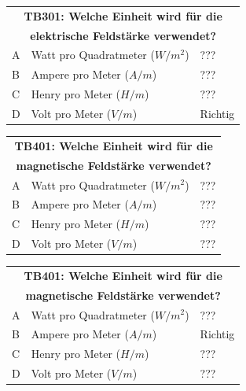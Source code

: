 \begin{frame}
	\begin{center}
	\begin{tabular}{|l|l|l|}
		\hline
		\multicolumn{3}{|c|}{\textbf{TB301: Welche Einheit wird für die}}\\
		\multicolumn{3}{|c|}{\textbf{elektrische Feldstärke verwendet?}}\\
		\hline
		A & Watt pro Quadratmeter ($W/m^2$) & ???     \\ \hline
		B & Ampere pro Meter ($A/m$)        & ???     \\ \hline
		C & Henry pro Meter ($H/m$)         & ???     \\ \hline
		D & Volt pro Meter ($V/m$)          & Richtig \\ \hline
	\end{tabular}
	\end{center}
\end{frame}

\begin{frame}
	\begin{center}
	\begin{tabular}{|l|l|l|}
		\hline
		\multicolumn{3}{|c|}{\textbf{TB401:  Welche Einheit wird für die}}\\
		\multicolumn{3}{|c|}{\textbf{magnetische Feldstärke verwendet?}}\\
		\hline
		A & Watt pro Quadratmeter ($W/m^2$) & ???     \\ \hline
		B & Ampere pro Meter ($A/m$)        & ???     \\ \hline
		C & Henry pro Meter ($H/m$)         & ???     \\ \hline
		D & Volt pro Meter ($V/m$)          & ???     \\ \hline
	\end{tabular}
	\end{center}
\end{frame}

\begin{frame}
	\begin{center}
	\begin{tabular}{|l|l|l|}
		\hline
		\multicolumn{3}{|c|}{\textbf{TB401:  Welche Einheit wird für die}}\\
		\multicolumn{3}{|c|}{\textbf{magnetische Feldstärke verwendet?}}\\
		\hline
		A & Watt pro Quadratmeter ($W/m^2$) & ???     \\ \hline
		B & Ampere pro Meter ($A/m$)        & Richtig     \\ \hline
		C & Henry pro Meter ($H/m$)         & ???     \\ \hline
		D & Volt pro Meter ($V/m$)          & ???     \\ \hline
	\end{tabular}
	\end{center}
\end{frame}

